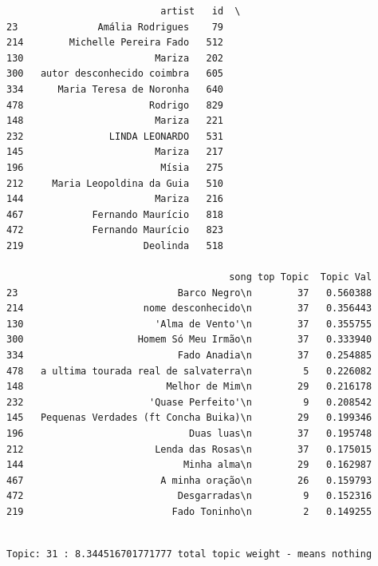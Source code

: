 \documentclass[11pt]{article}
\begin{document}
    
    \begin{verbatim}
                           artist   id  \
23              Amália Rodrigues    79   
214        Michelle Pereira Fado   512   
130                       Mariza   202   
300   autor desconhecido coimbra   605   
334      Maria Teresa de Noronha   640   
478                      Rodrigo   829   
148                       Mariza   221   
232               LINDA LEONARDO   531   
145                       Mariza   217   
196                        Mísia   275   
212     Maria Leopoldina da Guia   510   
144                       Mariza   216   
467            Fernando Maurício   818   
472            Fernando Maurício   823   
219                     Deolinda   518   

                                       song top Topic  Topic Val  
23                            Barco Negro\n        37   0.560388  
214                     nome desconhecido\n        37   0.356443  
130                       'Alma de Vento'\n        37   0.355755  
300                    Homem Só Meu Irmão\n        37   0.333940  
334                           Fado Anadia\n        37   0.254885  
478   a ultima tourada real de salvaterra\n         5   0.226082  
148                         Melhor de Mim\n        29   0.216178  
232                      'Quase Perfeito'\n         9   0.208542  
145   Pequenas Verdades (ft Concha Buika)\n        29   0.199346  
196                             Duas luas\n        37   0.195748  
212                       Lenda das Rosas\n        37   0.175015  
144                            Minha alma\n        29   0.162987  
467                        A minha oração\n        26   0.159793  
472                           Desgarradas\n         9   0.152316  
219                          Fado Toninho\n         2   0.149255  
    \end{verbatim}

    
    \begin{Verbatim}[commandchars=\\\{\}]

Topic: 31 : 8.344516701771777 total topic weight - means nothing

    \end{Verbatim}
\end{document}
